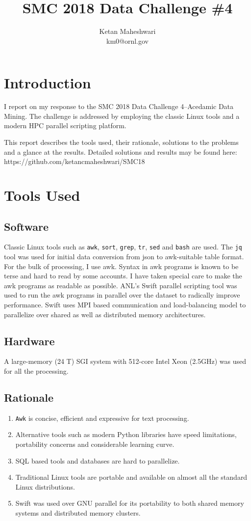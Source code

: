 \documentclass{report}
\title{SMC 2018 Data Challenge \#4}
\author{Ketan Maheshwari\\ km0@ornl.gov}
\begin{document}
\maketitle
\section*{Introduction}

I report on my response to the SMC 2018 Data Challenge 4--Acedamic Data Mining.
The challenge is addressed by employing the classic Linux tools and a modern HPC
parallel scripting platform.

This report describes the tools used, their rationale, solutions to the
problems and a glance at the results. Detailed solutions and results may be
found here: https://github.com/ketancmaheshwari/SMC18

\section*{Tools Used}
\subsection*{Software}
Classic Linux tools such as \texttt{awk}, \texttt{sort}, \texttt{grep},
\texttt{tr}, \texttt{sed} and \texttt{bash} are used.  The \texttt{jq} tool was
used for initial data conversion from json to awk-suitable table format. For
the bulk of processing, I use awk. Syntax in awk programs is known to be terse
and hard to read by some accounts. I have taken special care to make the awk
programs as readable as possible.  ANL's Swift parallel scripting tool was used
to run the awk programs in parallel over the dataset to radically improve
performance. Swift uses MPI based communication and load-balancing model to
parallelize over shared as well as distributed memory architectures.

\subsection*{Hardware}
A large-memory (24 T) SGI system with 512-core Intel Xeon (2.5GHz) was used for
all the processing.

\subsection*{Rationale}
\begin{enumerate}
\item \texttt{Awk} is concise, efficient and expressive for text processing.
\item Alternative tools such as modern Python libraries have speed limitations, portability concerns and considerable learning curve.
\item SQL based tools and databases are hard to parallelize.
\item Traditional Linux tools are portable and available on almost all the standard Linux distributions.
\item Swift was used over GNU parallel for its portability to both shared memory systems and distributed memory clusters.
\end{enumerate}
\end{document}
